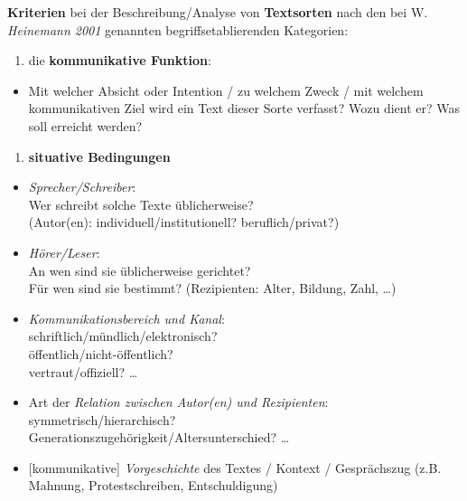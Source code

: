 \documentclass[
  letterpaper,
]{scrbook}
\providecommand{\tightlist}{%
  \setlength{\itemsep}{0pt}\setlength{\parskip}{0pt}}\usepackage{longtable,booktabs,array}
\begin{document}
\textbf{Kriterien} bei der Beschreibung/Analyse von \textbf{Textsorten}
nach den bei W. \emph{Heinemann 2001} genannten begriffsetablierenden
Kategorien:

\begin{enumerate}
\def\labelenumi{\arabic{enumi}.}
\tightlist
\item
  die \textbf{kommunikative Funktion}:\\
\end{enumerate}

\begin{itemize}
\tightlist
\item
  Mit welcher Absicht oder Intention / zu welchem Zweck / mit welchem
  kommunikativen Ziel wird ein Text dieser Sorte verfasst? Wozu dient
  er? Was soll erreicht werden?
\end{itemize}

\begin{enumerate}
\def\labelenumi{\arabic{enumi}.}
\setcounter{enumi}{1}
\tightlist
\item
  \textbf{situative Bedingungen}\\
\end{enumerate}

\begin{itemize}
\tightlist
\item
  \emph{Sprecher/Schreiber}:\\
  Wer schreibt solche Texte üblicherweise?\\
  (Autor(en): individuell/institutionell? beruflich/privat?)\\
\item
  \emph{Hörer/Leser}:\\
  An wen sind sie üblicherweise gerichtet?\\
  Für wen sind sie bestimmt? (Rezipienten: Alter, Bildung, Zahl,
  \ldots)\\
\item
  \emph{Kommunikationsbereich und Kanal}:\\
  schriftlich/mündlich/elektronisch?\\
  öffentlich/nicht-öffentlich?\\
  vertraut/offiziell? \ldots{}\\
\item
  Art der \emph{Relation zwischen Autor(en) und Rezipienten}:\\
  symmetrisch/hierarchisch?\\
  Generationszugehörigkeit/Altersunterschied? \ldots{}\\
\item
  {[}kommunikative{]} \emph{Vorgeschichte} des Textes / Kontext /
  Gesprächszug (z.B. Mahnung, Protestschreiben, Entschuldigung)
\end{itemize}
\end{document}
